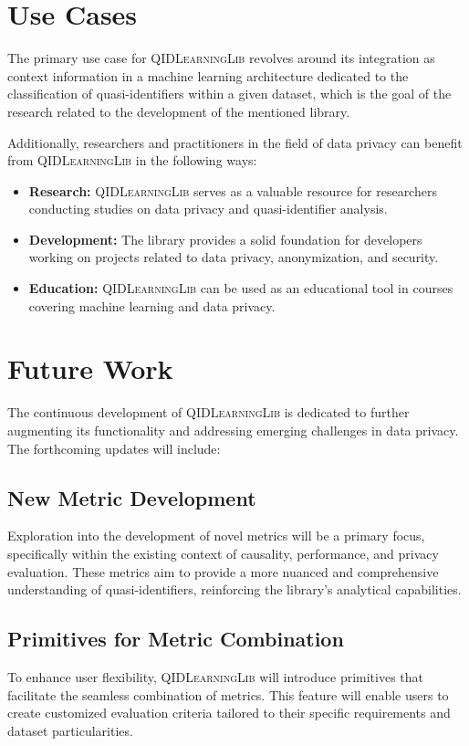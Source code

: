 \documentclass[twoside,11pt]{article}
\begin{document}
\section{Use Cases}

The primary use case for \textsc{QIDLearningLib} revolves around its integration as context information in a machine learning architecture dedicated to the classification of quasi-identifiers within a given dataset, which is the goal of the research related to the development of the mentioned library.

Additionally, researchers and practitioners in the field of data privacy can benefit from \textsc{QIDLearningLib} in the following ways:
\begin{itemize}
    \item \textbf{Research:} \textsc{QIDLearningLib} serves as a valuable resource for researchers conducting studies on data privacy and quasi-identifier analysis.
    \item \textbf{Development:} The library provides a solid foundation for developers working on projects related to data privacy, anonymization, and security.
    \item \textbf{Education:} \textsc{QIDLearningLib} can be used as an educational tool in courses covering machine learning and data privacy.
\end{itemize}

\section{Future Work}
The continuous development of \textsc{QIDLearningLib} is dedicated to further augmenting its functionality and addressing emerging challenges in data privacy. The forthcoming updates will include:

\subsection{New Metric Development}
Exploration into the development of novel metrics will be a primary focus, specifically within the existing context of causality, performance, and privacy evaluation. These metrics aim to provide a more nuanced and comprehensive understanding of quasi-identifiers, reinforcing the library's analytical capabilities.

\subsection{Primitives for Metric Combination}
To enhance user flexibility, \textsc{QIDLearningLib} will introduce primitives that facilitate the seamless combination of metrics. This feature will enable users to create customized evaluation criteria tailored to their specific requirements and dataset particularities.
\end{document}
